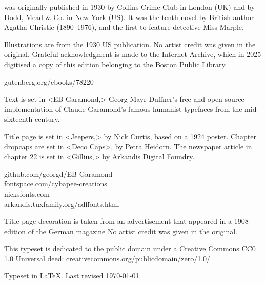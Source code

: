 \documentclass[
paper=5.5in:8.5in,
]{scrbook}
\begin{document}
\vfill
\begin{minipage}{\textwidth}
 was originally published in 1930 by Collins Crime Club in London (UK) and by Dodd, Mead \& Co. in New York (US).  It was the tenth novel by British author Agatha Christie (1890--1976), and the first to feature detective Miss Marple.

Illustrations are from the 1930 US publication. No artist credit was given in the original. Grateful acknowledgment is made to the Internet Archive, which in 2025 digitised a copy of this edition belonging to the Boston Public Library.
\end{minipage}
\vfill
gutenberg.org/ebooks/78220
\vfill
\divider
\vfill
\begin{minipage}{\textwidth}
Text is set in <EB Garamond,> Georg Mayr-Duffner's free and open source implementation of Claude Garamond’s famous humanist typefaces from the mid-sixteenth century.

Title page is set in <Jeepers,> by Nick Curtis, based on a 1924 poster. Chapter dropcaps are set in <Deco Caps>, by Petra Heidorn. The newspaper article in chapter 22 is set in <Gillius,> by Arkandis Digital Foundry.
\end{minipage}
\vfill
github.com/georgd/EB-Garamond\\fontspace.com/cybapee-creations\\nicksfonts.com\\arkandis.tuxfamily.org/adffonts.html
\vfill
\divider
\vfill
\begin{minipage}{\textwidth}
Title page decoration is taken from an advertisement that appeared in a 1908 edition of the German magazine  No artist credit was given in the original.
\end{minipage}
\vfill
\divider
\vfill
\begin{minipage}{\textwidth}
This typeset is dedicated to the public domain under a Creative Commons CC0 1.0 Universal deed: creativecommons.org/publicdomain/zero/1.0/\\
\end{minipage}
\vfill
\divider
\vfill
Typeset in \LaTeX{}. Last revised \today.
\thispagestyle{empty}
\end{document}
